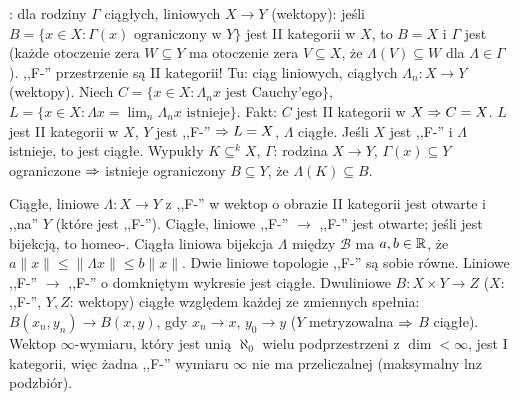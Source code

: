 : dla  rodziny $\Gamma$  ciągłych, liniowych $X \to Y$ (wektopy): jeśli $B = \{x \in X: \Gamma(x) \textrm{ ograniczony w } Y\}$ jest II kategorii w $X$, to $B = X$ i $\Gamma$ jest  (każde otoczenie zera $W \subseteq Y$ ma otoczenie zera $V \subseteq X$, że $\Lambda (V) \subseteq W$ dla $\Lambda \in \Gamma$).
,,F-'' przestrzenie są II kategorii!
Tu: ciąg liniowych, ciągłych $\Lambda_n \colon X \to Y$ (wektopy).
Niech $C = \{x \in X: \Lambda_n x \textrm{ jest Cauchy'ego}\}$,
 $L = \{x \in X : \Lambda x = \lim_n \Lambda_n x \textrm{ istnieje}\}$.
Fakt: $C$ jest II kategorii w $X \Rightarrow C = X$.
$L$ jest II kategorii w $X$, $Y$ jest ,,F-'' $\Rightarrow L = X$, $\Lambda$ ciągłe.
Jeśli $X$ jest ,,F-'' i $\Lambda$ istnieje, to jest ciągłe.
Wypukły $K \subseteq^k X$, $\Gamma$: rodzina $X \to Y$, $\Gamma(x) \subseteq Y$ ograniczone $\Rightarrow$ istnieje ograniczony $B \subseteq Y$, że $\Lambda(K) \subseteq B$.

Ciągłe, liniowe  $\Lambda \colon X \to Y$ z ,,F-'' w wektop o obrazie II kategorii jest otwarte i ,,na'' $Y$ (które jest ,,F-''). %
Ciągłe, liniowe ,,F-'' $\to$ ,,F-'' jest otwarte; jeśli jest bijekcją, to homeo-.
Ciągła liniowa bijekcja $\Lambda$ między $\mathscr B$ ma $a, b \in \mathbb{R}$, że $a \|x\| \le \|\Lambda x\| \le b \|x\|$.
Dwie liniowe topologie ,,F-'' są sobie równe.
Liniowe ,,F-'' $\to$ ,,F-'' o domkniętym wykresie jest ciągłe.
Dwuliniowe $B \colon X \times Y \to Z$ ($X$: ,,F-'', $Y, Z$: wektopy) ciągłe względem każdej ze zmiennych spełnia: $B(x_n, y_n) \to B(x,y)$, gdy $x_n \to x$, $y_0 \to y$ ($Y$ metryzowalna $\Rightarrow$ $B$ ciągłe).
Wektop $\infty$-wymiaru, który jest unią $\aleph_0$ wielu podprzestrzeni z $\dim < \infty$, jest I kategorii, więc żadna ,,F-'' wymiaru $\infty$ nie ma przeliczalnej  (maksymalny lnz podzbiór).